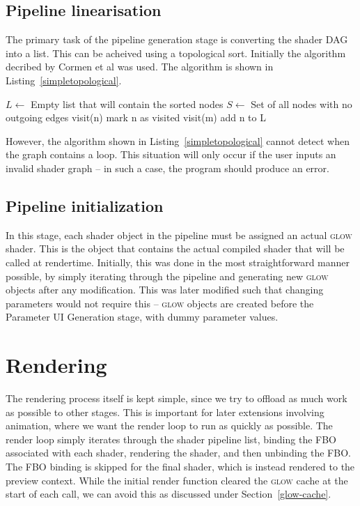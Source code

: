 \documentclass[12pt,twoside,notitlepage]{report}
\begin{document}
\subsection*{Pipeline linearisation}
The primary task of the pipeline generation stage is converting the shader DAG into a list. This can be acheived using a topological sort. Initially the algorithm decribed by Cormen et al \cite{topsort} was used. The algorithm is shown in Listing~\ref{simpletopological}.
\begin{algorithm}
\label{simpletopological}
\begin{algorithmic}
\State $L \gets $ Empty list that will contain the sorted nodes
\State $S \gets $ Set of all nodes with no outgoing edges
    visit(n)
\EndFor 
{}
        mark n as visited
            visit(m)
        \EndFor
        add n to L
    \EndIf
\EndFunction
\end{algorithmic}
\end{algorithm}
However, the algorithm shown in Listing~\ref{simpletopological} cannot detect when the graph contains a loop. This situation will only occur if the user inputs an invalid shader graph -- in such a case, the program should produce an error.

\subsection*{Pipeline initialization}
\label{pipe-init}
In this stage, each shader object in the pipeline must be assigned an actual \textsc{glow} shader. This is the object that contains the actual compiled shader that will be called at rendertime. Initially, this was done in the most straightforward manner possible, by simply iterating through the pipeline and generating new \textsc{glow} objects after any modification. This was later modified such that changing parameters would not require this -- \textsc{glow} objects are created before the Parameter UI Generation stage, with dummy parameter values. 

\section{Rendering}
The rendering process itself is kept simple, since we try to offload as much work as possible to other stages. This is important for later extensions involving animation, where we want the render loop to run as quickly as possible. The render loop simply iterates through the shader pipeline list, binding the FBO associated with each shader, rendering the shader, and then unbinding the FBO. The FBO binding is skipped for the final shader, which is instead rendered to the preview context. While the initial render function cleared the \textsc{glow} cache at the start of each call, we can avoid this as discussed under Section~\ref{glow-cache}.
\end{document}
